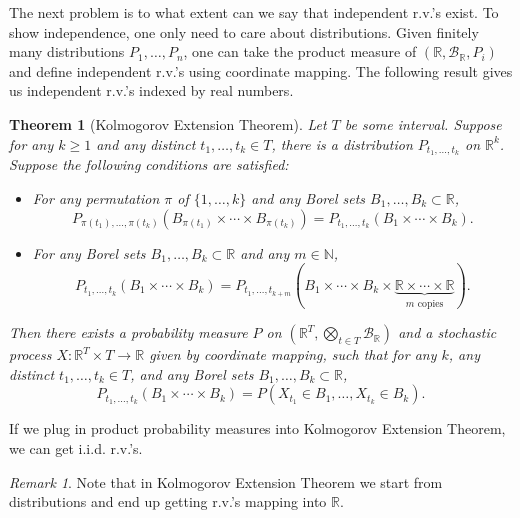 \documentclass[openany]{book}
\newtheorem{theorem}{Theorem}[chapter]
\theoremstyle{definition}
\theoremstyle{remark}
\newtheorem*{remark}{Remark}
\begin{document}
The next problem is to what extent can we say that independent r.v.'s exist. To show independence, one only need to care about distributions. Given finitely many distributions $P_1,\ldots,P_n$, one can take the product measure of $(\mathbb{R},\mathcal{B}_{\mathbb{R}},P_i)$ and define independent r.v.'s using coordinate mapping. The following result gives us independent r.v.'s indexed by real numbers.
\begin{theorem}[Kolmogorov Extension Theorem]
    Let $T$ be some interval. Suppose for any $k\ge1$ and any distinct $t_1,\ldots,t_k\in T$, there is a distribution $P_{t_1,\ldots,t_k}$ on $\mathbb{R}^k$. Suppose the following conditions are satisfied:
    \begin{itemize}
        \item For any permutation $\pi$ of $\{1,\ldots,k\}$ and any Borel sets $B_1,\ldots,B_k\subset \mathbb{R}$,
        \begin{equation*}
            P_{\pi(t_1),\ldots,\pi(t_k)}(B_{\pi(t_1)}\times\cdots\times B_{\pi(t_k)})=P_{t_1,\ldots,t_k}(B_1\times\cdots\times B_k).
        \end{equation*}

        \item For any Borel sets $B_1,\ldots,B_k\subset \mathbb{R}$ and any $m\in \mathbb{N}$,
        \begin{equation*}
            P_{t_1,\ldots,t_k}(B_1\times\cdots\times B_k)=P_{t_1,\ldots,t_{k+m}}(B_1\times\cdots\times B_k\times\underbrace{\mathbb{R}\times\cdots\times \mathbb{R}}_{m\textrm{ copies}}).
        \end{equation*}
    \end{itemize}
    Then there exists a probability measure $P$ on $(\mathbb{R}^T,\bigotimes_{t\in T}\mathcal{B}_{\mathbb{R}})$ and a stochastic process $X:\mathbb{R}^T\times T\to \mathbb{R}$ given by coordinate mapping, such that for any $k$, any distinct $t_1,\ldots,t_k\in T$, and any Borel sets $B_1,\ldots,B_k\subset \mathbb{R}$,
    \begin{equation*}
        P_{t_1,\ldots,t_k}(B_1\times\cdots\times B_k)=P(X_{t_1}\in B_1,\ldots,X_{t_k}\in B_k).
    \end{equation*}
\end{theorem}
If we plug in product probability measures into Kolmogorov Extension Theorem, we can get i.i.d. r.v.'s.
\begin{remark}
    Note that in Kolmogorov Extension Theorem we start from distributions and end up getting r.v.'s mapping into $\mathbb{R}$.
\end{remark}
\end{document}
